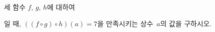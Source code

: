 세 함수 $f$, $g$, $h$에 대하여\par\smallskip{}\par\smallskip\noindent 일 때, $((f\circ g)\circ h)(a)=7$을 만족시키는 상수~$a$의 값을 구하시오.
